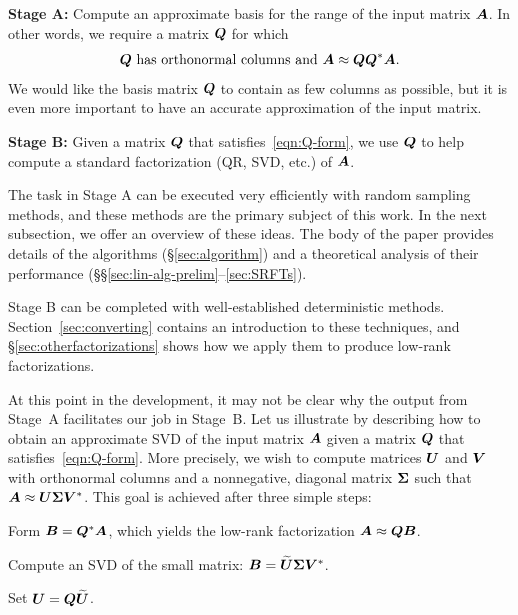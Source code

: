\documentclass[final]{siamltex}
\newcounter{algorithm}[section]
\newcommand{\notate}[1]{\textcolor{red}{\textbf{[#1]}}}
\newenvironment{widequote}{\begin{list}{}
      {\setlength{\rightmargin}{0mm}\setlength{\leftmargin}{5mm}}
      \item[]}{\end{list}}
\begin{document}
\begin{widequote}
\noindent
\textbf{Stage A:} Compute an approximate basis for the range of the input matrix $\bm{A}$. In other words,
we require a matrix $\bm{Q}$ for which
\begin{equation} \label{eqn:Q-form}
\text{$\mtx{Q}$ has orthonormal columns and $\mtx{A} \approx \mtx{Q}\mtx{Q}^{\adj}\mtx{A}$.}
\end{equation}
We would like the basis matrix $\bm{Q}$ to contain as few columns as possible, but it is
even more important to have an accurate approximation of the input matrix.


\vspace{2mm}

\textbf{Stage B:}
Given a matrix $\bm{Q}$ that satisfies~\eqref{eqn:Q-form},
we use $\bm{Q}$ to help compute a standard factorization (QR, SVD, etc.) of $\bm{A}$.
\end{widequote}

\lsp

The task in Stage A can be executed very efficiently with random sampling methods,
and these methods are the primary subject of this work.  In the next subsection, we offer an
overview of these ideas.  The body of the paper provides details of the algorithms
(\S\ref{sec:algorithm}) and a theoretical analysis of their performance
(\S\S\ref{sec:lin-alg-prelim}--\ref{sec:SRFTs}).

Stage B can be completed with well-established deterministic methods.
Section~\ref{sec:converting} contains an introduction to these techniques,
and \S\ref{sec:otherfactorizations} shows how we apply them to produce
low-rank factorizations.

At this point in the development, it may not be clear why the output from
Stage~A facilitates our job in Stage~B.
Let us illustrate by describing how to obtain an approximate SVD
of the input matrix  $\bm{A}$ given a matrix $\bm{Q}$ that satisfies~\eqref{eqn:Q-form}.
More precisely, we wish to compute matrices $\bm{U}$ and $\bm{V}$ with orthonormal columns
and a nonnegative, diagonal matrix $\bm{\Sigma}$ such that
$\bm{A} \approx \bm{U\Sigma V}^*$.
This goal is achieved after three simple steps:
\lsp
\begin{remunerate}
\item   Form $\bm{B} = \bm{Q}^{*}\bm{A}$, which yields
the low-rank factorization $\bm{A} \approx \bm{Q}\bm{B}$.
\item   Compute an SVD of the small matrix: $\bm{B} = \widetilde{\bm{U}}\bm{\Sigma}\bm{V}^{*}$.
\item   Set $\bm{U} = \bm{Q}\widetilde{\bm{U}}$.
\end{remunerate}
\lsp
\end{document}
